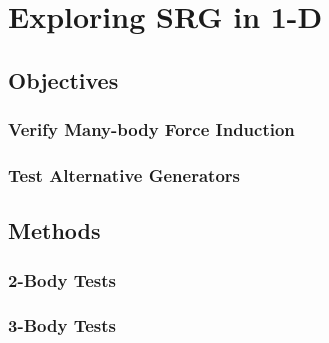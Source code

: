 \chapter{Exploring SRG in 1-D}

\section{Objectives}

\subsection{Verify Many-body Force Induction}

\subsection{Test Alternative Generators}

\section{Methods}

\subsection{2-Body Tests}

\subsection{3-Body Tests}
